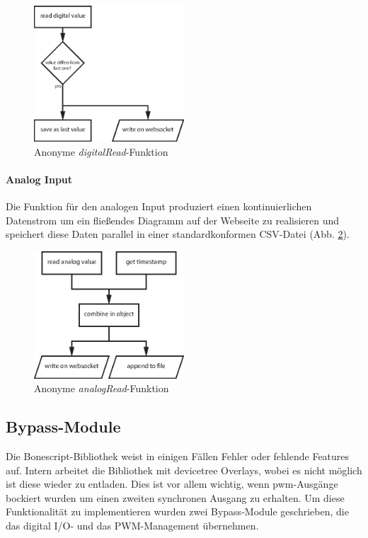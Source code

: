\begin{figure}[ht]
  \centering
  \includegraphics[width = 0.5\textwidth]{documentation/images/wssTimerDigital.eps}
  \caption{Anonyme \textit{digitalRead}-Funktion}
  \label{fig:wssTimerDigital}
\end{figure}

\paragraph{Analog Input} Die Funktion für den analogen Input produziert einen kontinuierlichen Datenstrom um ein fließendes Diagramm auf der Webseite zu realisieren und speichert diese Daten parallel in einer standardkonformen CSV-Datei \cite{rfc4180} (Abb. \ref{fig:wssTimerAnalog}).

\begin{figure}[ht]
  \centering
  \includegraphics[width = 0.5\textwidth]{documentation/images/wssTimerAnalog.eps}
  \caption{Anonyme \textit{analogRead}-Funktion}
  \label{fig:wssTimerAnalog}
\end{figure}

\subsection{Bypass-Module}
Die Bonescript-Bibliothek weist in einigen Fällen Fehler oder fehlende Features auf. Intern arbeitet die Bibliothek mit \gls{devicetree} Overlays, wobei es nicht möglich ist diese wieder zu entladen. Dies ist vor allem wichtig, wenn \gls{pwm}-Ausgänge bockiert wurden um einen zweiten synchronen Ausgang zu erhalten. Um diese Funktionalität zu implementieren wurden zwei Bypass-Module geschrieben, die das digital I/O- und das PWM-Management übernehmen.

